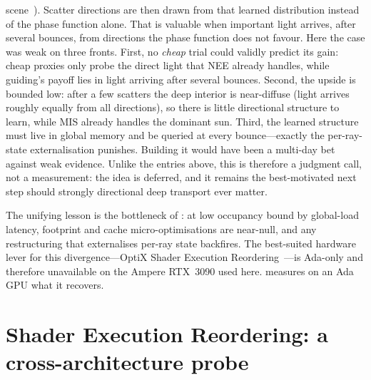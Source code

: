 \begin{itemize}
  scene~\cite{Muller2017}). Scatter directions are then drawn from that learned distribution
  instead of the phase function alone. That is valuable when important light arrives, after several
  bounces, from directions the phase function does not favour. Here the case was weak on three
  fronts. First, no \emph{cheap} trial could validly predict its gain: cheap proxies only probe the direct light that NEE already handles, while guiding's payoff lies in light arriving
after several bounces. Second, the upside is bounded low: after a few scatters the deep interior is near-diffuse
(light arrives roughly equally from all directions), so there is little directional
structure to learn, while MIS already handles the dominant sun. Third, the learned structure must live in global memory and be
  queried at every bounce---exactly the per-ray-state externalisation 
  punishes. Building it would have been a multi-day bet against weak evidence. Unlike the
  entries above, this is therefore a judgment call, not a measurement: the idea is deferred,
  and it remains the best-motivated next step should strongly directional deep transport ever matter.
\end{itemize}

The unifying lesson is the bottleneck of : at low occupancy bound by global-load
latency, footprint and cache micro-optimisations are near-null, and any restructuring that externalises
per-ray state backfires. The best-suited hardware lever for this divergence---OptiX Shader Execution
Reordering~\cite{NvidiaSER2022}---is Ada-only and therefore unavailable on the Ampere RTX~3090 used here.
 measures on an Ada GPU what it recovers.

\section{Shader Execution Reordering: a cross-architecture probe}
\label{sec:ser}

